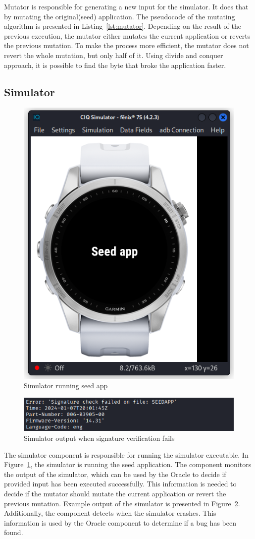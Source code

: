 Mutator is responsible for generating a new input for the simulator.
It does that by mutating the original(seed) application.
The pseudocode of the mutating algorithm is presented in Listing~\ref{lst:mutator}.
Depending on the result of the previous execution, the mutator either mutates the current application or reverts the previous mutation.
To make the process more efficient, the mutator does not revert the whole mutation, but only half of it.
Using divide and conquer approach, it is possible to find the byte that broke the application faster.


\subsection*{Simulator}
    \begin{figure}[b]
        \centering
        \includegraphics[width=0.39\linewidth]{../../images/simulator-seed-app}
        \caption{Simulator running seed app}
        \label{fig:simulator-seed-app}
    \end{figure}
    \begin{figure}
        \centering
        \includegraphics[width=0.6\linewidth]{../../images/simulator-signature-failed}
        \caption{Simulator output when signature verification fails}
        \label{fig:simulator-signature-failed}
    \end{figure}
The simulator component is responsible for running the simulator executable.
In Figure~\ref{fig:simulator-seed-app}, the simulator is running the seed application.
The component monitors the output of the simulator, which can be used by the Oracle to decide if provided input has been executed successfully.
This information is needed to decide if the mutator should mutate the current application or revert the previous mutation.
Example output of the simulator is presented in Figure~\ref{fig:simulator-signature-failed}.
Additionally, the component detects when the simulator crashes.
This information is used by the Oracle component to determine if a bug has been found.

